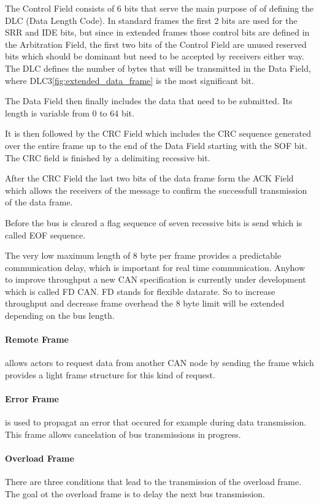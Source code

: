 	The Control Field consists of 6 bits that serve the main purpose of of defining
	the DLC (Data Length Code). In standard frames the first 2 bits are used for
	the SRR and IDE bits, but since in extended frames those control bits are
	defined in the Arbitration Field, the first two bits of the Control Field are
	unused reserved bits which should be dominant but need to be accepted by
	receivers either way. The DLC defines the number of bytes that will be
	transmitted in the Data Field, where DLC3\autoref{fig:extended_data_frame} is
	the most significant bit.
	
	The Data Field then finally includes the data that need to be submitted. Its
	length is variable from 0 to 64 bit. 
	
	It is then followed by the CRC Field which includes the CRC sequence generated
	over the entire frame up to the end of the Data Field starting with the SOF
	bit. The CRC field is finished by a delimiting recessive bit. 
	
	After the CRC Field the last two bits of the data frame form the ACK Field
	which allows the receivers of the message to confirm the
	successfull transmission of the data frame.
	
	Before the bus is cleared a flag sequence of seven recessive bits is send which
	is called EOF sequence.
	
	The very low maximum length of 8 byte per frame provides a predictable
	communication delay, which is important for real time communication. Anyhow
	to improve throughput a new CAN specification is currently under development
	which is called FD CAN. FD stands for flexible datarate. So to increase
	throughput and decrease frame overhead the 8 byte limit will be extended
	depending on the bus length. 
	 
	\paragraph{Remote Frame} allows actors to request data from another CAN node
	by sending the frame which provides a light frame structure for this kind of
	request.
	
	\paragraph{Error Frame} is used to propagat an error that occured for
	example during data transmission. This frame allows cancelation of bus
	transmissions in progress.
    
    \paragraph{Overload Frame}
	There are three conditions that lead to the transmission of the overload frame.
	The goal ot the overload frame is to delay the next bus transmission.
    
